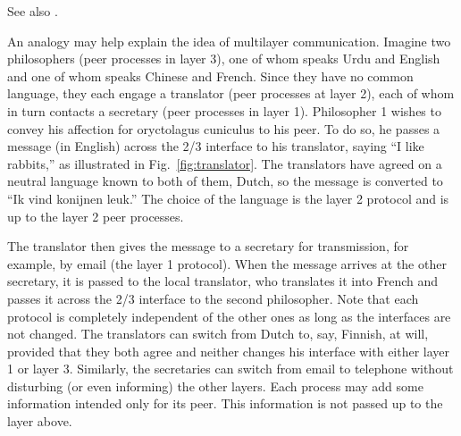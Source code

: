 See also .

An analogy may help explain the idea of multilayer communication. Imagine two philosophers
(peer processes in layer 3), one of whom speaks Urdu and English and one of whom speaks
Chinese and French. Since they have no common language, they each engage a translator
(peer processes at layer 2), each of whom in turn contacts a secretary (peer processes in
layer 1). Philosopher 1 wishes to convey his affection for oryctolagus cuniculus to his
peer. To do so, he passes a message (in English) across the 2/3 interface to his
translator, saying ``I like rabbits,'' as illustrated in Fig.~\ref{fig:translator}. The
translators have agreed on a neutral language known to both of them, Dutch, so the message
is converted to ``Ik vind konijnen leuk.'' The choice of the language is the layer 2
protocol and is up to the layer 2 peer processes.

The translator then gives the message to a secretary for transmission, for example, by
email (the layer 1 protocol). When the message arrives at the other secretary, it is
passed to the local translator, who translates it into French and passes it across the 2/3
interface to the second philosopher. Note that each protocol is completely independent of
the other ones as long as the interfaces are not changed. The translators can switch from
Dutch to, say, Finnish, at will, provided that they both agree and neither changes his
interface with either layer 1 or layer 3. Similarly, the secretaries can switch from email
to telephone without disturbing (or even informing) the other layers. Each process may add
some information intended only for its peer. This information is not passed up to the
layer above.


